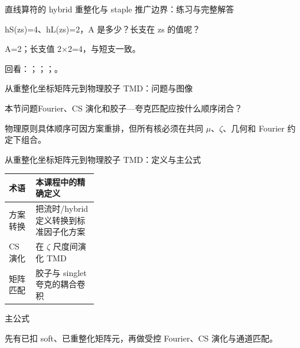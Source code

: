 \begin{frame}[t]{直线算符的 hybrid 重整化与 staple 推广边界：练习与完整解答}
\footnotesize
\begin{block}{}hS(zs)=4、hL(zs)=2，A 是多少？长支在 zs 的值呢？\end{block}
\begin{exampleblock}{}A=2；长支值 2\ensuremath{\times}2=4，与短支一致。\end{exampleblock}
\vfill
\scriptsize 回看：；；；。
\end{frame}

\begin{frame}[t]{从重整化坐标矩阵元到物理胶子 TMD：问题与图像}
\footnotesize
\begin{block}{本节问题}Fourier、CS 演化和胶子—夸克匹配应按什么顺序闭合？\end{block}
\begin{block}{物理原则}\quad 具体顺序可因方案重排，但所有核必须在共同 \ensuremath{\mu}、\ensuremath{\zeta}、几何和 Fourier 约定下组合。\end{block}
\end{frame}

\begin{frame}[t]{从重整化坐标矩阵元到物理胶子 TMD：定义与主公式}
\footnotesize\begin{tabularx}{\linewidth}{p{0.30\linewidth}Y}
\toprule 术语 & 本课程中的精确定义\\\midrule
{} 方案转换 & 把流时/\allowbreak{}hybrid 定义转换到标准因子化方案\\
 CS 演化 & 在 \ensuremath{\zeta} 尺度间演化 TMD\\
 矩阵匹配 & 胶子与 singlet 夸克的耦合卷积\\
\bottomrule\end{tabularx}\vspace{0.15cm}
\begin{block}{ 主公式}\centering{}\end{block}
先有已扣 soft、已重整化矩阵元，再做受控 Fourier、CS 演化与通道匹配。
\end{frame}

